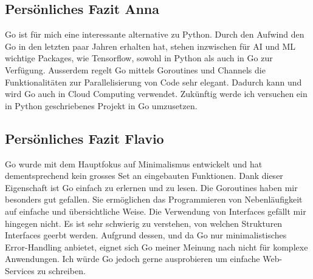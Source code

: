 \documentclass[11pt]{article}
\begin{document}
\subsection{Persönliches Fazit Anna}
Go ist für mich eine interessante alternative zu Python. Durch den Aufwind den Go in den letzten paar Jahren erhalten hat, stehen inzwischen für AI und ML wichtige Packages, wie Tensorflow, sowohl in Python als auch in Go zur Verfügung. Ausserdem regelt Go mittels Goroutines und Channels die Funktionalitäten zur Parallelisierung von Code sehr elegant. Dadurch kann und wird Go auch in Cloud Computing verwendet. Zukünftig werde ich versuchen ein in Python geschriebenes Projekt in Go umzusetzen. 

\subsection{Persönliches Fazit Flavio}
Go wurde mit dem Hauptfokus auf Minimalismus entwickelt und hat dementsprechend kein grosses Set an eingebauten Funktionen. Dank dieser Eigenschaft ist Go einfach zu erlernen und zu lesen. Die Goroutines haben mir besonders gut gefallen. Sie ermöglichen das Programmieren von Nebenläufigkeit auf einfache und übersichtliche Weise. Die Verwendung von Interfaces gefällt mir hingegen nicht. Es ist sehr schwierig zu verstehen, von welchen Strukturen Interfaces geerbt werden. Aufgrund dessen, und da Go nur minimalistisches Error-Handling anbietet, eignet sich Go meiner Meinung nach nicht für komplexe Anwendungen. Ich würde Go jedoch gerne ausprobieren um einfache Web-Services zu schreiben.

\medskip

 
\end{document}

